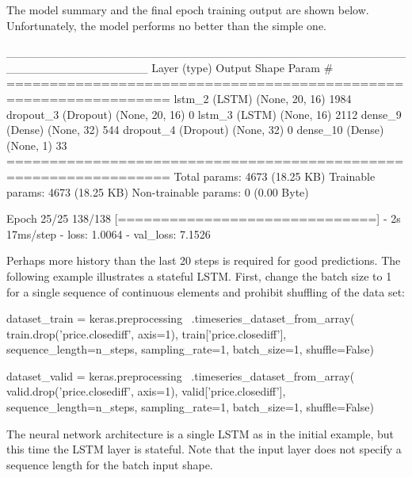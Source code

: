 The model summary and the final epoch training output are shown below. Unfortunately, the model performs no better than the simple one.

\begin{samepage}
\begin{textcode}
_________________________________________________________________
 Layer (type)                Output Shape              Param #   
=================================================================
 lstm_2 (LSTM)               (None, 20, 16)            1984      
 dropout_3 (Dropout)         (None, 20, 16)            0         
 lstm_3 (LSTM)               (None, 16)                2112      
 dense_9 (Dense)             (None, 32)                544       
 dropout_4 (Dropout)         (None, 32)                0         
 dense_10 (Dense)            (None, 1)                 33        
=================================================================
Total params: 4673 (18.25 KB)
Trainable params: 4673 (18.25 KB)
Non-trainable params: 0 (0.00 Byte)

Epoch 25/25
138/138 [==============================] - 2s 17ms/step 
- loss: 1.0064 - val_loss: 7.1526
\end{textcode}
\end{samepage}

Perhaps more history than the last 20 steps is required for good predictions. The following example illustrates a stateful LSTM. First, change the batch size to 1 for a single sequence of continuous elements and prohibit shuffling of the data set:

\begin{samepage}
\begin{pythoncode}
dataset_train = keras.preprocessing \
    .timeseries_dataset_from_array(
    train.drop('price.closediff', axis=1),
    train['price.closediff'],
    sequence_length=n_steps,
    sampling_rate=1, batch_size=1, shuffle=False)

dataset_valid = keras.preprocessing \
    .timeseries_dataset_from_array(
    valid.drop('price.closediff', axis=1),
    valid['price.closediff'],
    sequence_length=n_steps,
    sampling_rate=1, batch_size=1, shuffle=False)
\end{pythoncode}
\end{samepage}

The neural network architecture is a single LSTM as in the initial example, but this time the LSTM layer is stateful. Note that the input layer does not specify a sequence length for the batch input shape.

